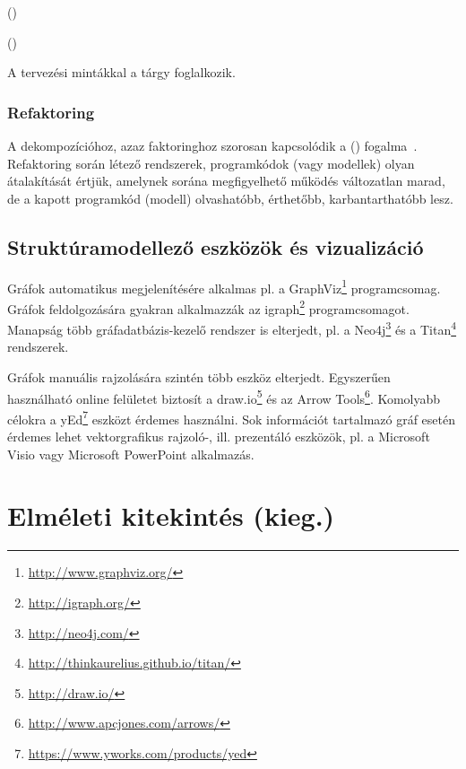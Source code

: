  () 

 ()



A tervezési mintákkal a \sznikak tárgy foglalkozik.

\subsubsection{Refaktoring}

A dekompozícióhoz, azaz faktoringhoz szorosan kapcsolódik a  () fogalma~\cite{fowler2012refactoring}. Refaktoring során létező rendszerek, programkódok (vagy modellek) olyan átalakítását értjük, amelynek sorána megfigyelhető működés változatlan marad, de a kapott programkód (modell) olvashatóbb, érthetőbb, karbantarthatóbb lesz.

\subsection{Struktúramodellező eszközök és vizualizáció}

Gráfok automatikus megjelenítésére alkalmas pl. a GraphViz\footnote{\url{http://www.graphviz.org/}} programcsomag. Gráfok feldolgozására gyakran alkalmazzák az igraph\footnote{\url{http://igraph.org/}} programcsomagot. Manapság több gráfadatbázis-kezelő rendszer is elterjedt, pl. a Neo4j\footnote{\url{http://neo4j.com/}} és a Titan\footnote{\url{http://thinkaurelius.github.io/titan/}} rendszerek.

Gráfok manuális rajzolására szintén több eszköz elterjedt. Egyszerűen használható online felületet biztosít a draw.io\footnote{\url{http://draw.io/}} és az Arrow Tools\footnote{\url{http://www.apcjones.com/arrows/}}. Komolyabb célokra a yEd\footnote{\url{https://www.yworks.com/products/yed}} eszközt érdemes használni. Sok információt tartalmazó gráf esetén érdemes lehet vektorgrafikus rajzoló-, ill. prezentáló eszközök, pl. a Microsoft Visio vagy Microsoft PowerPoint alkalmazás.


\section{Elméleti kitekintés (kieg.)}

